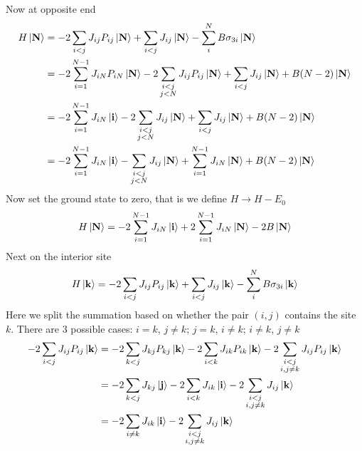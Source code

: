 \documentclass[../../../main.tex]{subfiles}
\begin{document}
Now at opposite end
\begin{align*}
    H \ket{\mathbf{N}}
     & =   -2\sum_{i<j}J_{ij}  P_{ij}\ket{\mathbf{N}}  + \sum_{i<j} J_{ij}\ket{\mathbf{N}} - \sum_{i } ^N B \sigma_{3i}\ket{\mathbf{N}} \\
     & =   -2 \sum_{i=1}^{N-1}  J_{iN} P_{iN} \ket{\mathbf{N}} - 2\sum_{\substack{i<j                                                   \\j < N}} J_{ij}  P_{ij}\ket{\mathbf{N}} + \sum_{i<j}  J_{ij} \ket{\mathbf{N}} + B(N-2)\ket{\mathbf{N}} \\
     & =   -2 \sum_{i=1}^{N-1}  J_{iN} \ket{\mathbf{i}} - 2\sum_{\substack{i<j                                                          \\j < N}} J_{ij} \ket{\mathbf{N}} + \sum_{i<j}  J_{ij} \ket{\mathbf{N}} + B(N-2)\ket{\mathbf{N}} \\
     & =   -2 \sum_{i=1}^{N-1}  J_{iN} \ket{\mathbf{i}} -\sum_{\substack{i<j                                                            \\j<N}} J_{ij} \ket{\mathbf{N}} + \sum_{i=1}^{N-1} J_{iN} \ket{\mathbf{N}}  + B(N-2)\ket{\mathbf{N}}
\end{align*}
Now set the ground state to zero, that is we define $H \to H -E_0$
\begin{equation*}
    H \ket{\mathbf{N}} =   -2 \sum_{i=1}^{N-1}  J_{iN} \ket{\mathbf{i}} +2 \sum_{i=1}^{N-1} J_{iN} \ket{\mathbf{N}}  -2B \ket{\mathbf{N}}
\end{equation*}
Next on the interior site
\begin{equation*}
    H \ket{\mathbf{k}}
    =   -2\sum_{i<j}J_{ij}  P_{ij}\ket{\mathbf{k}}  + \sum_{i<j} J_{ij}\ket{\mathbf{k}} - \sum_{i } ^N B \sigma_{3i}\ket{\mathbf{k}}
\end{equation*}
Here we split the summation based on whether the pair $(i,j)$ contains the site $k$.
There are 3 possible cases: $i=k$, $j \neq k$; $j=k$, $i \neq k$; $i \neq  k$, $j \neq k$
\begin{align*}
    -2\sum_{i<j}J_{ij}  P_{ij}\ket{\mathbf{k}}
     & =    -2\sum_{k<j}J_{kj}  P_{kj}\ket{\mathbf{k}} -2\sum_{i<k}J_{ik}  P_{ik}\ket{\mathbf{k}}  -2\sum_{\substack{i<j \\i,j \neq k}}J_{ij}  P_{ij}\ket{\mathbf{k}} \\
     & =    -2\sum_{k<j}J_{kj}\ket{\mathbf{j}} -2\sum_{i<k}J_{ik}  \ket{\mathbf{i}}  -2\sum_{\substack{i<j               \\i,j \neq k}}J_{ij}\ket{\mathbf{k}} \\
     & = -2\sum_{i \neq k}J_{ik}  \ket{\mathbf{i}} - 2\sum_{\substack{i<j                                                \\i,j \neq k}}J_{ij}\ket{\mathbf{k}}
\end{align*}
\end{document}
